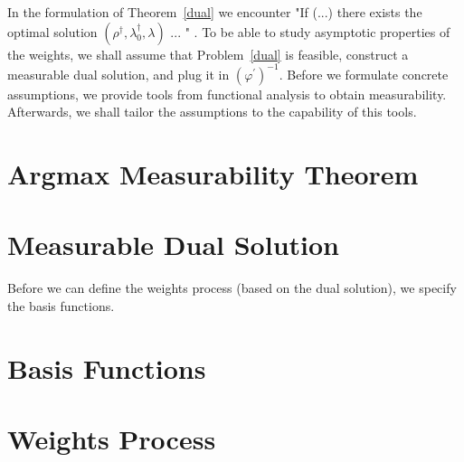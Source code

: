 In the formulation of Theorem~\ref{dual} we encounter "If (...) there exists the optimal solution $(\rho^\dagger,\lambda_0^\dagger,\lambda)$ ... " .
To be able to study asymptotic properties of the weights, we 
shall assume that Problem~\ref{dual} is feasible,
construct a measurable dual solution, and plug it in $(\varphi^{'})^{-1}$.
Before we formulate concrete assumptions, we provide tools from functional analysis
to obtain measurability. Afterwards, we shall tailor the assumptions to the capability of this tools.
\section{Argmax Measurability Theorem}
  
\section{Measurable Dual Solution}
  
Before we can define the weights process (based on the dual solution), we specify the basis functions.
\section{Basis Functions}
  
\section{Weights Process}
  
